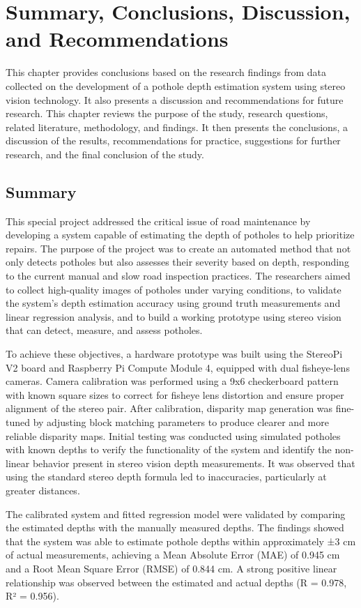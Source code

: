 \chapter{Summary, Conclusions, Discussion, and Recommendations}
This chapter provides conclusions based on the research findings from data collected on the development of a pothole depth estimation system using stereo vision technology. It also presents a discussion and recommendations for future research. This chapter reviews the purpose of the study, research questions, related literature, methodology, and findings. It then presents the conclusions, a discussion of the results, recommendations for practice, suggestions for further research, and the final conclusion of the study.

\section{Summary}
This special project addressed the critical issue of road maintenance by developing a system capable of estimating the depth of potholes to help prioritize repairs. The purpose of the project was to create an automated method that not only detects potholes but also assesses their severity based on depth, responding to the current manual and slow road inspection practices. The researchers aimed to collect high-quality images of potholes under varying conditions, to validate the system’s depth estimation accuracy using ground truth measurements and linear regression analysis, and to build a working prototype using stereo vision that can detect, measure, and assess potholes. 

To achieve these objectives, a hardware prototype was built using the StereoPi V2 board and Raspberry Pi Compute Module 4, equipped with dual fisheye-lens cameras. Camera calibration was performed using a 9x6 checkerboard pattern with known square sizes to correct for fisheye lens distortion and ensure proper alignment of the stereo pair. After calibration, disparity map generation was fine-tuned by adjusting block matching parameters to produce clearer and more reliable disparity maps. Initial testing was conducted using simulated potholes with known depths to verify the functionality of the system and identify the non-linear behavior present in stereo vision depth measurements. It was observed that using the standard stereo depth formula led to inaccuracies, particularly at greater distances. 

The calibrated system and fitted regression model were validated by comparing the estimated depths with the manually measured depths. The findings showed that the system was able to estimate pothole depths within approximately ±3 cm of actual measurements, achieving a Mean Absolute Error (MAE) of 0.945 cm and a Root Mean Square Error (RMSE) of 0.844 cm. A strong positive linear relationship was observed between the estimated and actual depths (R = 0.978, R² = 0.956).

